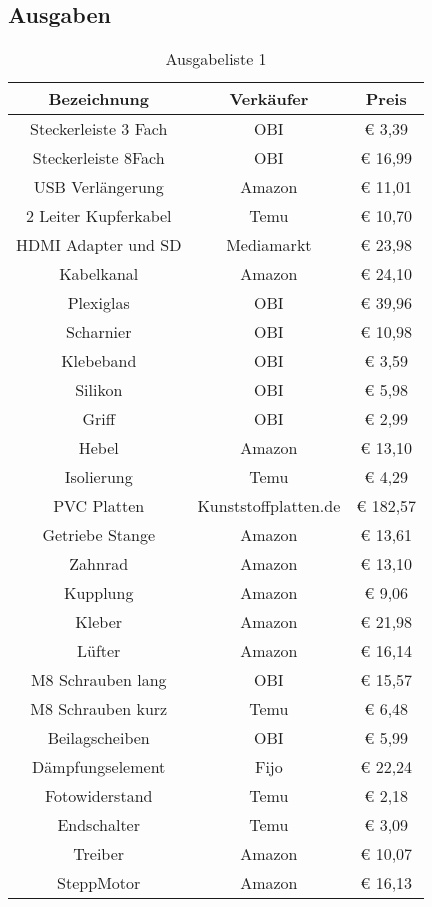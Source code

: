 \subsection{Ausgaben}
\begin{table}[H]
    \centering
    \begin{tabular}{ | c | c | c | } 
  \hline
   \textbf{Bezeichnung} & \textbf{Verkäufer} & \textbf{Preis}\\ 
  \hline
    Steckerleiste 3 Fach & OBI & € 3,39\\ 
  \hline
    Steckerleiste 8Fach	&OBI	&€ 16,99 \\ 
  \hline
  USB Verlängerung 	&Amazon&	€ 11,01\\ 
  \hline
  2 Leiter Kupferkabel	&Temu	&€ 10,70 \\ 
  \hline
  HDMI Adapter und SD	&Mediamarkt&	€ 23,98\\ 
  \hline
    Kabelkanal	&Amazon	&€ 24,10 \\ 
  \hline
  Plexiglas	&OBI	&€ 39,96\\ 
  \hline
  Scharnier	&OBI	&€ 10,98 \\ 
  \hline
  Klebeband	&OBI&	€ 3,59\\ 
  \hline
    Silikon	&OBI	&€ 5,98 \\ 
  \hline
  Griff	&OBI&	€ 2,99\\ 
  \hline
  Hebel	&Amazon	&€ 13,10 \\ 
  \hline
  Isolierung	&Temu	&€ 4,29\\ 
  \hline
    PVC Platten	&Kunststoffplatten.de&€ 182,57 \\ 
  \hline
  Getriebe Stange	&Amazon	&€ 13,61\\ 
  \hline
  Zahnrad&	Amazon	&€ 13,10 \\ 
  \hline
  Kupplung	&Amazon	&€ 9,06\\ 
  \hline
   Kleber	&Amazon	&€ 21,98 \\ 
  \hline
  Lüfter	&Amazon&	€ 16,14\\ 
  \hline
  M8 Schrauben lang&OBI	&€ 15,57 \\ 
  \hline
 M8 Schrauben kurz	&Temu	&€ 6,48\\ 
  \hline
    Beilagscheiben	&OBI	&€ 5,99 \\ 
  \hline
  Dämpfungselement	&Fijo	&€ 22,24\\ 
  \hline
  Fotowiderstand	&Temu	&€ 2,18 \\ 
  \hline
  Endschalter&	Temu	&€ 3,09 \\ 
  \hline
  Treiber	&Amazon&	€ 10,07\\ 
  \hline
    SteppMotor	&Amazon	&€ 16,13 \\ 
  \hline
  
\end{tabular}
    \caption{Ausgabeliste 1}
\end{table}
\vspace{5mm}
\pagebreak

